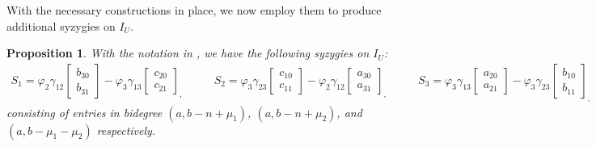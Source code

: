 \documentclass[reqno]{amsart}
\newtheorem{prop}[thm]{Proposition}
\numberwithin{equation}{section}
\theoremstyle{definition}
\begin{document}
With the necessary constructions in place, we now employ them to produce additional syzygies on $I_U$.


\begin{prop}\label{dim 4 new syzygies}
With the notation in , we have the following syzygies on $I_U$:
\[
\begin{array}{ccc}
  S_1= \varphi_2\gamma_{12}\begin{bmatrix}
                 b_{30}\\
                 b_{31}
             \end{bmatrix}
             -\varphi_3\gamma_{13}\begin{bmatrix}
                 c_{20}\\
                 c_{21}
             \end{bmatrix}_,    \quad \quad
&  %
S_2= \varphi_3\gamma_{23}\begin{bmatrix}
                 c_{10}\\
                 c_{11}
             \end{bmatrix}
             -\varphi_2\gamma_{12}\begin{bmatrix}
                 a_{30}\\
                 a_{31}
             \end{bmatrix}_,\quad\quad
&  %
S_3= \varphi_3\gamma_{13}\begin{bmatrix}
                 a_{20}\\
                 a_{21}
             \end{bmatrix}
             -\varphi_3\gamma_{23}\begin{bmatrix}
                 b_{10}\\
                 b_{11}
             \end{bmatrix}_,
\end{array}
\]
consisting of entries in bidegree $(a,b-n+\mu_1)$, $(a,b-n+\mu_2)$, and $(a,b-\mu_1-\mu_2)$ respectively.
\end{prop}
\end{document}
